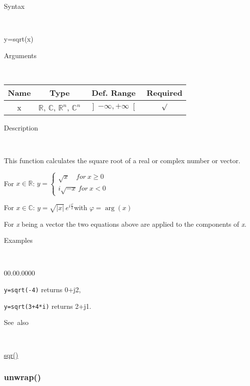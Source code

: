 \begin{description}
\item [Syntax]~
\end{description}
y=sqrt(x)

\begin{description}
\item [Arguments]~
\end{description}
\begin{tabular}{|c|c|c|c|}
\hline 
Name&
Type&
Def. Range&
Required\tabularnewline
\hline
\hline 
x&
$\mathbb{R}$, $\mathbb{C}$, $\mathbb{R}^{n}$, $\mathbb{C}^{n}$&
$\left]-\infty,+\infty\right[$&
$\surd$\tabularnewline
\hline
\end{tabular}

\begin{description}
\item [Description]~
\end{description}
This function calculates the square root of a real or complex number
or vector.

\medskip{}
For $x\in\mathbb{R}$: $y=\left\{ \begin{array}{l}
\sqrt{x}\quad for\: x\geq0\\
i\sqrt{-x}\, for\: x<0\end{array}\right.$ 
\medskip{}

For $x\in\mathbb{C}$: $y=\sqrt{\left|x\right|}\, e^{i\frac{\varphi}{2}}$with
$\varphi=\arg\left(x\right)$
\medskip{}

For \textit{x} being a vector the two equations above are
applied to the components of \textit{x}.

\begin{description}
\item [Examples]~
\end{description}
\begin{lyxlist}{00.00.0000}
\item [\texttt{y=sqrt(-4)}]returns 0+j2,
\item [\texttt{y=sqrt(3+4{*}i)}]returns 2+j1.
\end{lyxlist}
\begin{description}
\item [See~also]~
\end{description}
\textcolor{blue}{\hyperlink{sqr}{sqr()}}


\newpage
\subsubsection*{\hypertarget{unwrap}{}{\Large unwrap()}}


